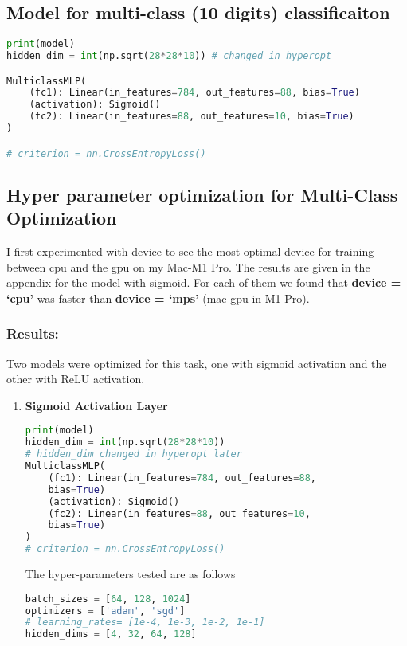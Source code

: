 \begin{solve}

    \subsection{Model for multi-class (10 digits) classificaiton}

    \begin{lstlisting}[language=python]
print(model)
hidden_dim = int(np.sqrt(28*28*10)) # changed in hyperopt

MulticlassMLP(
    (fc1): Linear(in_features=784, out_features=88, bias=True)
    (activation): Sigmoid() 
    (fc2): Linear(in_features=88, out_features=10, bias=True)
)

# criterion = nn.CrossEntropyLoss()

    \end{lstlisting}


    \subsection{Hyper parameter optimization for Multi-Class Optimization}
    
    I first experimented with device to see the most optimal device for training between cpu and the gpu on my Mac-M1 Pro. The results are given in the appendix for the model with sigmoid. For each of them we found that \textbf{device = `cpu'} was faster than  \textbf{device = `mps'} (mac gpu in M1 Pro).

    \subsubsection{Results:}
    Two models were optimized for this task, one with sigmoid activation and the other with ReLU activation.

    \begin{enumerate}
        \item \textbf{Sigmoid Activation Layer}
\begin{lstlisting}[language=python]
print(model)
hidden_dim = int(np.sqrt(28*28*10)) 
# hidden_dim changed in hyperopt later
MulticlassMLP(
    (fc1): Linear(in_features=784, out_features=88, 
    bias=True)
    (activation): Sigmoid()
    (fc2): Linear(in_features=88, out_features=10, 
    bias=True)
)
# criterion = nn.CrossEntropyLoss()
        \end{lstlisting}


        The hyper-parameters tested are as follows 
        \begin{lstlisting}[language=python]
batch_sizes = [64, 128, 1024]
optimizers = ['adam', 'sgd']
# learning_rates= [1e-4, 1e-3, 1e-2, 1e-1]
hidden_dims = [4, 32, 64, 128]
        \end{lstlisting}
        

\end{enumerate}
\end{solve}
